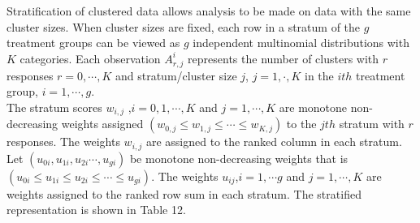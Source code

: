 \documentclass[12pt,oneside]{report}
\theoremstyle{definition}
\theoremstyle{mystyle}
\begin{document}
Stratification of clustered data allows analysis to be made on data with the same cluster sizes. When cluster sizes are fixed, each row in a stratum of the $g$ treatment groups can be viewed as $g$ independent  multinomial distributions with $K$ categories. Each observation $A_{r,j}^{i}$ represents the number of clusters with $r$ responses $r=0,\cdots,K$ and stratum/cluster size $j$, $j=1,\cdot,K$ in the $ith$ treatment group, $i=1,\cdots,g$.\\
The stratum scores $w_{i,j}$ ,$i=0,1,\cdots,K$ and $j=1,\cdots,K$ are monotone  non-decreasing  weights assigned   $\left(w_{0,j} \leq w_{1,j} \leq \cdots \leq w_{K,j} \right)$ to the $jth$ stratum with $r$ responses. The weights $w_{i,j}$ are  assigned to the ranked column  in each stratum.
Let $(u_{0i},u_{1i},u_{2i}\cdots,u_{gi})$  be monotone  non-decreasing weights that is $(u_{0i} \leq u_{1i} \leq u_{2i} \leq \cdots \leq u_{gi})$. The weights $u_{ij}$,$i=1,\cdots g$ and $j=1,\cdots,K$ are weights  assigned to  the ranked row sum  in each stratum. The stratified representation is shown in Table 12.




\newpage
	
\end{document}
